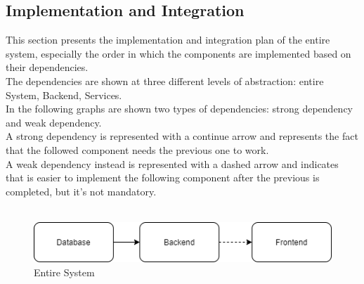 





\subsection{Implementation and Integration}
This section presents the implementation and integration plan of the entire system, especially the order in which the components are implemented based on their dependencies.\\
The dependencies are shown at three different levels of abstraction: entire System, Backend, Services. \\
In the following graphs are shown two types of dependencies: strong dependency and weak dependency.\\
A strong dependency is represented with a continue arrow and represents the fact that the followed component needs the previous one to work.\\
A weak dependency instead is represented with a dashed arrow and indicates that is easier to implement the following component after the previous is completed, but it's not mandatory.\\
\\
\begin{figure}[H]
    \centering
    \includegraphics{Images/IntegrationAndTestingPlan/System.png}
    \caption{Entire System}
    \label{fig:System}
\end{figure}

